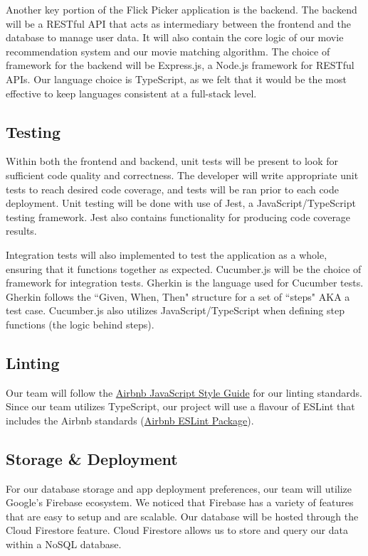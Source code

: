 \documentclass{article}
\begin{document}
Another key portion of the Flick Picker application is the backend. The backend will be a RESTful API that acts as intermediary between the frontend and the database to manage user data. It will also contain the core logic of our movie recommendation system and our movie matching algorithm. The choice of framework for the backend will be Express.js, a Node.js framework for RESTful APIs. Our language choice is TypeScript, as we felt that it would be the most effective to keep languages consistent at a full-stack level.

\subsection{Testing}
Within both the frontend and backend, unit tests will be present to look for sufficient code quality and correctness. The developer will write appropriate unit tests to reach desired code coverage, and tests will be ran prior to each code deployment. Unit testing will be done with use of Jest, a JavaScript/TypeScript testing framework. Jest also contains functionality for producing code coverage results.

Integration tests will also implemented to test the application as a whole, ensuring that it functions together as expected. Cucumber.js will be the choice of framework for integration tests. Gherkin is the language used for Cucumber tests. Gherkin follows the ``Given, When, Then" structure for a set of ``steps" AKA a test case. Cucumber.js also utilizes JavaScript/TypeScript when defining step functions (the logic behind steps). 


\subsection{Linting}
Our team will follow the \href{https://github.com/airbnb/javascript}{Airbnb JavaScript Style Guide} for our linting standards. Since our team utilizes TypeScript, our project will use a flavour of ESLint that includes the Airbnb standards (\href{https://www.npmjs.com/package/eslint-config-airbnb-typescript}{Airbnb ESLint Package}).

\subsection{Storage \& Deployment}
For our database storage and app deployment preferences, our team will utilize Google's Firebase ecosystem. We noticed that Firebase has a variety of features that are easy to setup and are scalable. Our database will be hosted through the Cloud Firestore feature. Cloud Firestore allows us to store and query our data within a NoSQL database. 
\end{document}
